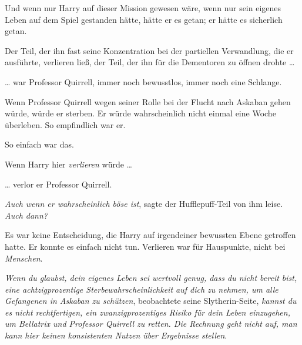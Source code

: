 Und wenn nur Harry auf dieser Mission gewesen wäre, wenn nur sein eigenes Leben auf dem Spiel gestanden hätte, hätte er es getan; er hätte es sicherlich getan.

Der Teil, der ihn fast seine Konzentration bei der partiellen Verwandlung, die er ausführte, verlieren ließ, der Teil, der ihn für die Dementoren zu öffnen drohte …

… war Professor Quirrell, immer noch bewusstlos, immer noch eine Schlange.

Wenn Professor Quirrell wegen seiner Rolle bei der Flucht nach Askaban gehen würde, würde er sterben. Er würde wahrscheinlich nicht einmal eine Woche überleben. So empfindlich war er.

So einfach war das.

Wenn Harry hier \emph{verlieren} würde …

… verlor er Professor Quirrell.

\emph{Auch wenn er wahrscheinlich böse ist}, sagte der Hufflepuff-Teil von ihm leise. \emph{Auch dann?}

Es war keine Entscheidung, die Harry auf irgendeiner bewussten Ebene getroffen hatte. Er konnte es einfach nicht tun. Verlieren war für Hauspunkte, nicht bei \emph{Menschen}.

\emph{Wenn du glaubst, dein eigenes Leben sei wertvoll genug, dass du nicht bereit bist, eine achtzigprozentige Sterbewahrscheinlichkeit auf dich zu nehmen, um alle Gefangenen in Askaban zu schützen}, beobachtete seine Slytherin-Seite, \emph{kannst du es nicht rechtfertigen, ein zwanzigprozentiges Risiko für dein Leben einzugehen, um Bellatrix und Professor Quirrell zu retten. Die Rechnung geht nicht auf, man kann hier keinen konsistenten Nutzen über Ergebnisse stellen}.

